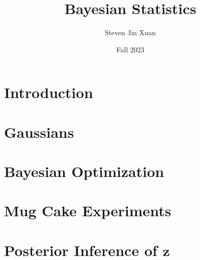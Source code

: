 \documentclass{article}[12, letterpaper]
\author{Steven Jin Xuan}
\date{Fall 2023}
\title{Bayesian Statistics}
\begin{document}

\section{Introduction}

\section{Gaussians}



\section{Bayesian Optimization}


\section{Mug Cake Experiments}

\section{Posterior Inference of $\mathbf{z}$}


{}

\end{document}
